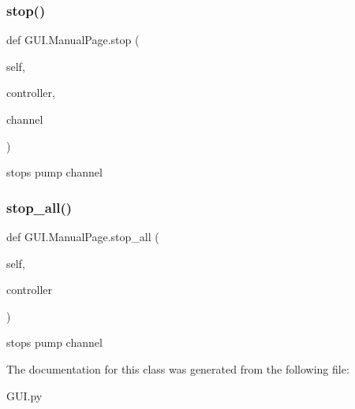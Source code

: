 \subsubsection{\texorpdfstring{stop()}{stop()}}
{\footnotesize\ttfamily def G\+U\+I.\+Manual\+Page.\+stop (\begin{DoxyParamCaption}\item[{}]{self,  }\item[{}]{controller,  }\item[{}]{channel }\end{DoxyParamCaption})}

\begin{DoxyVerb}stops pump channel\end{DoxyVerb}
 \mbox{\label{class_g_u_i_1_1_manual_page_a6e9cb2efbec0918bb12f6bc9f26fbfde}} 
\subsubsection{\texorpdfstring{stop\_all()}{stop\_all()}}
{\footnotesize\ttfamily def G\+U\+I.\+Manual\+Page.\+stop\+\_\+all (\begin{DoxyParamCaption}\item[{}]{self,  }\item[{}]{controller }\end{DoxyParamCaption})}

\begin{DoxyVerb}stops pump channel\end{DoxyVerb}
 

The documentation for this class was generated from the following file\+:\begin{DoxyCompactItemize}
\item 
G\+U\+I.\+py\end{DoxyCompactItemize}

